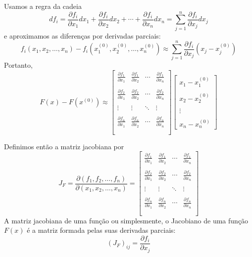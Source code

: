 \documentclass[main.tex]{subfiles}
\begin{document}
Usamos a regra da cadeia
$$df_i = \frac{\partial f_i}{\partial x_1} dx_1+\frac{\partial f_i}{\partial x_2} dx_2+\cdots + \frac{\partial f_i}{\partial x_n} dx_n=\sum_{j=1}^n\frac{\partial f_i}{\partial x_j} dx_j$$
e aproximamos as diferenças por derivadas parciais:
$$ f_i(x_1,x_2,\ldots,x_n)-f_i(x_1^{(0)},x_2^{(0)},\ldots,x_n^{(0)})\approx \sum_{j=1}^n \frac{\partial f_i}{\partial x_j}\left(x_j-x_j^{(0)}\right)$$
Portanto,
\begin{equation}\label{eq_approx_newton}F(x)-F(x^{(0)})\approx \left[
\begin{array}{ccccc}
\frac{\partial f_1}{\partial x_1}&\frac{\partial f_1}{\partial x_2}&\cdots&\frac{\partial f_1}{\partial x_n}\\~\\
\frac{\partial f_2}{\partial x_1}&\frac{\partial f_2}{\partial x_2}&\cdots&\frac{\partial f_2}{\partial x_n}\\~\\
\vdots&\vdots&\ddots&\vdots\\~\\
\frac{\partial f_n}{\partial x_1}&\frac{\partial f_n}{\partial x_2}&\cdots&\frac{\partial f_n}{\partial x_n}\\~\\
\end{array}
\right]\left[
\begin{array}{c}
x_1-x_1^{(0)}\\~~\\
x_2-x_2^{(0)}\\~~\\
\vdots\\~~\\
x_n-x_n^{(0)}
\end{array}
\right]
\end{equation}

Definimos então a matriz jacobiana por
$$J_F= \frac{\partial(f_1,f_2,\ldots,f_n)}{\partial(x_1,x_2,\ldots,x_n)}=\left[
\begin{array}{ccccc}
\frac{\partial f_1}{\partial x_1}&\frac{\partial f_1}{\partial x_2}&\cdots&\frac{\partial f_1}{\partial x_n}\\~\\
\frac{\partial f_2}{\partial x_1}&\frac{\partial f_2}{\partial x_2}&\cdots&\frac{\partial f_2}{\partial x_n}\\~\\
\vdots&\vdots&\ddots&\vdots\\~\\
\frac{\partial f_n}{\partial x_1}&\frac{\partial f_n}{\partial x_2}&\cdots&\frac{\partial f_n}{\partial x_n}\\~\\
\end{array}
\right]
$$
A matriz jacobiana de uma função ou simplesmente, o Jacobiano de uma função $F(x)$ é a matriz formada pelas suas derivadas parciais:
$$\left(J_F\right)_{ij}=\frac{\partial f_i}{\partial x_j}$$
\end{document}
